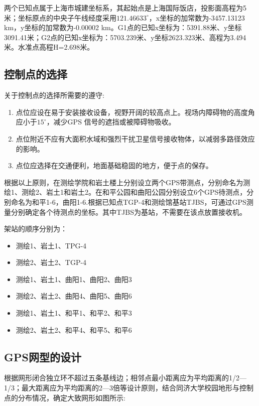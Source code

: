 \documentclass[a4paper,16pt,UTF8]{article}
\begin{document}
两个已知点属于上海市城建坐标系，其起始点是上海国际饭店，投影面高程为5米；坐标原点的中央子午线经度采用$121.46633^{\circ}$，x坐标的加常数为-3457.13123 km，y坐标的加常数为-0.00002 km。G1点的已知x坐标为：5391.88米、y坐标3091.41米；G2点的已知x坐标为：5703.239米、y坐标2623.323米、高程为3.494米。水准点高程H=2.698米。

\subsection{\Large 控制点的选择}
关于控制点的选择所需要的遵守:
\begin{enumerate}
    \item 点位应设在易于安装接收设备，视野开阔的较高点上。视场内障碍物的高度角应小于$15^{\circ}$，减少GPS 信号的遮挡或被障碍物吸收。
    \item 点位附近不应有大面积水域和强烈干扰卫星信号接收物体，以减弱多路径效应的影响。
    \item 点位应选择在交通便利，地面基础稳固的地方，便于点的保存。   
\end{enumerate}

根据以上原则，在测绘学院和岩土楼上分别设立两个GPS带测点，分别命名为测绘1、测绘2、岩土1和岩土2。在和平公园和曲阳公园分别设立6个GPS待测点，分别命名为和平1-6，曲阳1-6.根据已知点TGP-4和测绘馆基站TJBS，可通过GPS测量分别确定各个待测点的坐标。其中TJBS为基站，不需要在该点放置接收机。

架站的顺序分别为：
\begin{itemize}
    \item 测绘1、岩土1、TPG-4
    \item 测绘2、岩土2、TGP-4
    \item 测绘1、岩土1、曲阳1、曲阳2、曲阳3
    \item 测绘2、岩土2、曲阳4、曲阳5、曲阳6
    \item 测绘1、岩土1、和平1、和平2、和平3
    \item 测绘2、岩土2、和平4、和平5、和平6
\end{itemize}

\subsection{\Large GPS网型的设计}
根据网形闭合独立环不超过五条基线边；相邻点最小距离应为平均距离的1/2—1/3；最大距离应为平均距离的2—3倍等设计原则，结合同济大学校园地形与控制点的分布情况，确定大致网形如图所示:
\end{document}
